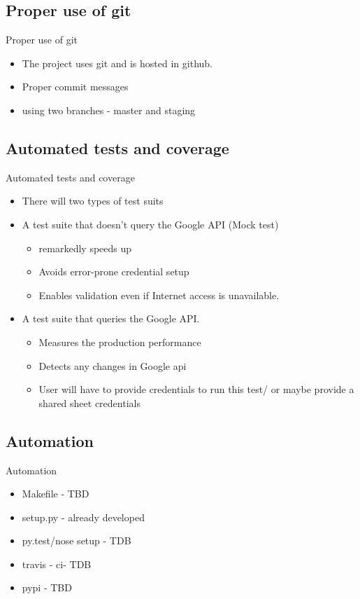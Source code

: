 \documentclass{beamer}
\begin{document}
\subsection{Proper use of git}
\begin{frame}{Proper use of git}
  \begin{itemize}
      \item {The project uses git and is hosted in github.}
      \item {Proper commit messages}
      \item{using two branches -  master and staging}
  \end{itemize}
\end{frame}

\subsection{Automated tests and coverage}
\begin{frame}{Automated tests and coverage}
  \begin{itemize}
  
  \item {There will two types of test suits}
  \item {
    A test suite that doesn't query the Google API (Mock test)
    \begin{itemize}
        \item{remarkedly speeds up}
        \item{Avoids error-prone credential setup}
        \item{Enables validation even if Internet access is unavailable.}
    \end{itemize}
  }
  \item {
    A test suite that queries the Google API.
    \begin{itemize}
        \item{Measures the production performance}
        \item{Detects any changes in Google api}
        \item{User will have to provide credentials to run this test/ or maybe provide a shared sheet credentials}
    \end{itemize}
  }
  \end{itemize}
\end{frame}


\subsection{Automation}
\begin{frame}{Automation}
  \begin{itemize}
  
    \item {Makefile - TBD}
    \item {setup.py - already developed}
    \item {py.test/nose setup - TDB}
    \item {travis - ci- TDB}
    \item {pypi - TBD}
  \end{itemize}
\end{frame}
\end{document}
